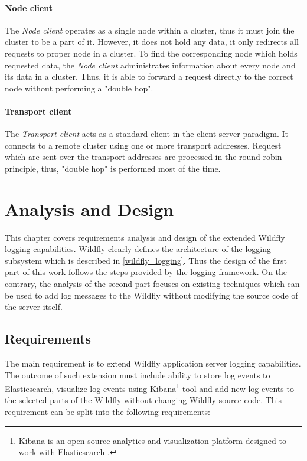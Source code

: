 \documentclass[12pt,oneside]{fithesis2}
\begin{document}
\subsubsection{Node client}
The \textit{Node client} operates as a single node within a cluster, thus it must join the cluster to be a part of it. However, it does not hold any data, it only redirects all requests to proper node in a cluster. To find the corresponding node which holds requested data, the \textit{Node client} administrates information about every node and its data in a cluster. Thus, it is able to forward a request directly to the correct node without performing a "double hop".

\subsubsection{Transport client}
\label{transport_client}
The \textit{Transport client} acts as a standard client in the client-server paradigm. It connects to a remote cluster using one or more transport addresses. Request which are sent over the transport addresses are processed in the round robin principle, thus, "double hop" is performed most of the time.

\chapter{Analysis and Design}
\label{analysis}
This chapter covers requirements analysis and design of the extended Wildfly logging capabilities. Wildfly clearly defines the architecture of the logging subsystem which is described in \ref{wildfly_logging}. Thus the design of the first part of this work follows the steps provided by the logging framework. On the contrary, the analysis of the second part focuses on existing techniques which can be used to add log messages to the Wildfly without modifying the source code of the server itself.

\section{Requirements}
\label{requirements}
The main requirement is to extend Wildfly application server logging capabilities. The outcome of such extension must include ability to store log events to Elasticsearch, visualize log events using Kibana\footnote{Kibana is an open source analytics and visualization platform designed to work with Elasticsearch \cite{kibana_doc}.} tool and add new log events to the selected parts of the Wildfly without changing Wildfly source code. This requirement can be split into the following requirements:
\end{document}
